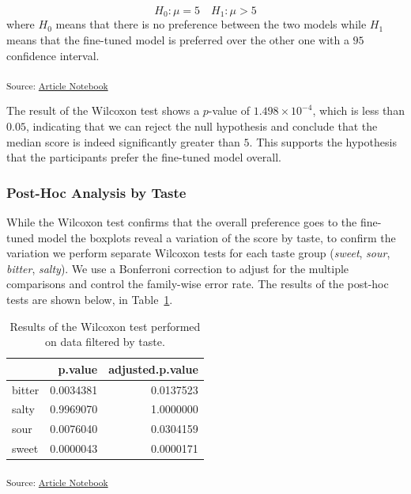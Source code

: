\documentclass[
  letterpaper,
  DIV=11,
  numbers=noendperiod]{scrartcl}
\begin{document}
\[
H_0: \mu = 5 \quad H_1: \mu > 5
\] where \(H_0\) means that there is no preference between the two
models while \(H_1\) means that the fine-tuned model is preferred over
the other one with a \(95%
\) confidence interval.

\textsubscript{Source:
\href{https://matteospanio.github.io/multimodal-symphony-survey-analysis/index.qmd.html}{Article
Notebook}}

The result of the Wilcoxon test shows a \(p\)-value of
\(\ensuremath{1.498\times 10^{-4}}\), which is less than \(0.05\),
indicating that we can reject the null hypothesis and conclude that the
median score is indeed significantly greater than \(5\). This supports
the hypothesis that the participants prefer the fine-tuned model
overall.

\subsubsection{Post-Hoc Analysis by
Taste}\label{post-hoc-analysis-by-taste}

While the Wilcoxon test confirms that the overall preference goes to the
fine-tuned model the boxplots reveal a variation of the score by taste,
to confirm the variation we perform separate Wilcoxon tests for each
taste group (\emph{sweet}, \emph{sour}, \emph{bitter}, \emph{salty}). We
use a Bonferroni correction to adjust for the multiple comparisons and
control the family-wise error rate. The results of the post-hoc tests
are shown below, in Table~\ref{tbl-wilcoxon-taste}.

\begin{longtable}[]{@{}lrr@{}}

\caption{\label{tbl-wilcoxon-taste}Results of the Wilcoxon test
performed on data filtered by taste.}

\tabularnewline

\toprule\noalign{}
& p.value & adjusted.p.value \\
\midrule\noalign{}
\endhead
\bottomrule\noalign{}
\endlastfoot
bitter & 0.0034381 & 0.0137523 \\
salty & 0.9969070 & 1.0000000 \\
sour & 0.0076040 & 0.0304159 \\
sweet & 0.0000043 & 0.0000171 \\

\end{longtable}

\textsubscript{Source:
\href{https://matteospanio.github.io/multimodal-symphony-survey-analysis/index.qmd.html}{Article
Notebook}}
\end{document}
